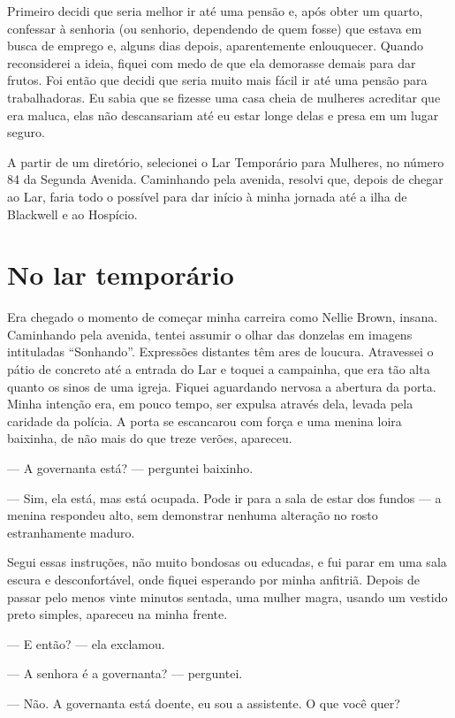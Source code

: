 Primeiro decidi que seria melhor ir até uma pensão e, após obter um
quarto, confessar à senhoria (ou senhorio, dependendo de quem fosse) que
estava em busca de emprego e, alguns dias depois, aparentemente
enlouquecer. Quando reconsiderei a ideia, fiquei com medo de que ela
demorasse demais para dar frutos. Foi então que decidi que seria muito
mais fácil ir até uma pensão para trabalhadoras. Eu sabia que se fizesse
uma casa cheia de mulheres acreditar que era maluca, elas não
descansariam até eu estar longe delas e presa em um lugar seguro.

A partir de um diretório, selecionei o Lar Temporário para Mulheres, no
número 84 da Segunda Avenida. Caminhando pela avenida, resolvi que,
depois de chegar ao Lar, faria todo o possível para dar início à minha
jornada até a ilha de Blackwell e ao Hospício.

\chapter{No lar
temporário}\label{capuxedtulo-iii-no-lar-temporuxe1rio}

Era chegado o momento de começar minha carreira como Nellie Brown,
insana. Caminhando pela avenida, tentei assumir o olhar das donzelas em
imagens intituladas ``Sonhando''. Expressões distantes têm ares de
loucura. Atravessei o pátio de concreto até a entrada do Lar e toquei a
campainha, que era tão alta quanto os sinos de uma igreja. Fiquei
aguardando nervosa a abertura da porta. Minha intenção era, em pouco
tempo, ser expulsa através dela, levada pela caridade da polícia. A
porta se escancarou com força e uma menina loira baixinha, de não mais
do que treze verões, apareceu.

--- A governanta está? --- perguntei baixinho.

--- Sim, ela está, mas está ocupada. Pode ir para a sala de estar dos
fundos --- a menina respondeu alto, sem demonstrar nenhuma alteração no
rosto estranhamente maduro.

Segui
essas instruções, não muito bondosas ou educadas, e fui parar em uma
sala escura e desconfortável, onde fiquei esperando por minha anfitriã.
Depois de passar pelo menos vinte minutos sentada, uma mulher magra,
usando um vestido preto simples, apareceu na minha frente. 

--- E então?
--- ela exclamou.

--- A senhora é a governanta? --- perguntei.

--- Não. A governanta está doente, eu sou a assistente. O que você quer?

